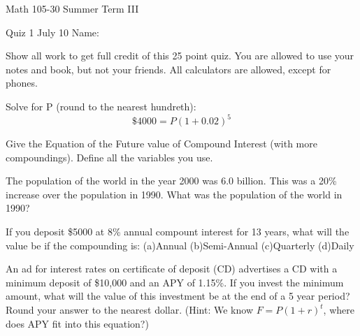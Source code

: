 \documentclass[11pt,epsfig]{article}
\begin{document}
Math 105-30 Summer Term III 

Quiz 1 July 10 \hspace{1.9in} {Name:} {\underline {\hspace{2.5in}}}
\vspace{2pc}

Show all work to get full credit of this 25 point quiz. You are allowed to use your notes and book, but not your friends. All calculators are allowed, except for phones.
\vspace{2pc}

\begin{problem}{5}
Solve for P (round to the nearest hundreth):
\begin{equation}
\$ 4000=P(1+0.02)^{5}
\end{equation}
\vfill
\end{problem}

\begin{problem}{4}
Give the Equation of the Future value of Compound Interest (with more compoundings). Define all the variables you use. 
\vfill
\end{problem}

\begin{problem}{5}
The population of the world in the year 2000 was 6.0 billion. This was a 20\%
increase over the population in 1990. What was the population of the world in 1990?
\vfill
\end{problem}

\newpage

\begin{problem}{6}
If you deposit \$5000 at 8\% annual compount interest for 13 years, what will the value be if the compounding is:
\newline(a)Annual
\newline(b)Semi-Annual
\newline(c)Quarterly
\newline(d)Daily
\vfill
\end{problem}

\begin{problem}{5}
An ad for interest rates on certificate of deposit (CD) advertises a CD with a minimum deposit of \$10,000 and an APY of 1.15\%. 
If you invest the minimum amount, what will the value of this investment be at the end of a 5 year period? Round your answer to the nearest dollar. (Hint: We know $F=P(1+r)^t$, where does APY fit into this equation?)
\vfill
\end{problem}

\showpoints
\end{document}
